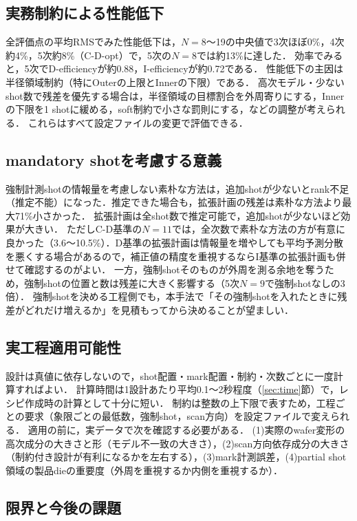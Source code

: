 \documentclass[10.5pt,a4paper]{ltjsarticle}
\begin{document}
\subsection{実務制約による性能低下}

全評価点の平均RMSでみた性能低下は，$N=8$〜19の中央値で3次ほぼ0\%，4次約4\%，5次約8\%（C-D-opt）で，5次の$N=8$では約13\%に達した．
効率でみると，5次でD-efficiencyが約0.88，I-efficiencyが約0.72である．
性能低下の主因は半径領域制約（特にOuterの上限とInnerの下限）である．
高次モデル・少ないshot数で残差を優先する場合は，半径領域の目標割合を外周寄りにする，Innerの下限を1 shotに緩める，soft制約で小さな罰則にする，などの調整が考えられる．
これらはすべて設定ファイルの変更で評価できる．

\subsection{mandatory shotを考慮する意義}

強制計測shotの情報量を考慮しない素朴な方法は，追加shotが少ないとrank不足（推定不能）になった．推定できた場合も，拡張計画の残差は素朴な方法より最大71\%小さかった．
拡張計画は全shot数で推定可能で，追加shotが少ないほど効果が大きい．
ただしC-D基準の$N=11$では，全次数で素朴な方法の方が有意に良かった（3.6〜10.5\%）．D基準の拡張計画は情報量を増やしても平均予測分散を悪くする場合があるので，補正値の精度を重視するならI基準の拡張計画も併せて確認するのがよい．
一方，強制shotそのものが外周を測る余地を奪うため，強制shotの位置と数は残差に大きく影響する（5次$N=9$で強制shotなしの3倍）．
強制shotを決める工程側でも，本手法で「その強制shotを入れたときに残差がどれだけ増えるか」を見積もってから決めることが望ましい．

\subsection{実工程適用可能性}

設計は真値に依存しないので，shot配置・mark配置・制約・次数ごとに一度計算すればよい．
計算時間は1設計あたり平均0.1〜2秒程度（\ref{sec:time}節）で，レシピ作成時の計算として十分に短い．
制約は整数の上下限で表すため，工程ごとの要求（象限ごとの最低数，強制shot，scan方向）を設定ファイルで変えられる．
適用の前に，実データで次を確認する必要がある．
(1)実際のwafer変形の高次成分の大きさと形（モデル不一致の大きさ），(2)scan方向依存成分の大きさ（制約付き設計が有利になるかを左右する），(3)mark計測誤差，(4)partial shot領域の製品dieの重要度（外周を重視するか内側を重視するか）．

\subsection{限界と今後の課題}
\end{document}
